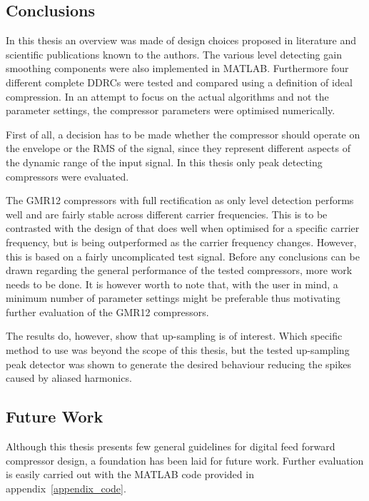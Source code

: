 \documentclass[../main2.tex]{subfiles}
\begin{document}
\subsection{Conclusions}\label{discussion_results}
In this thesis an overview was made of design choices proposed in literature and scientific publications known to the authors. The various level detecting gain smoothing components were also implemented in MATLAB\textsuperscript{\textregistered}. Furthermore four different complete DDRCs were tested and compared using a definition of ideal compression. In an attempt to focus on the actual algorithms and not the parameter settings, the compressor parameters were optimised numerically.

First of all, a decision has to be made whether the compressor should operate on the envelope or the RMS of the signal, since they represent different aspects of the dynamic range of the input signal. In this thesis only peak detecting compressors were evaluated.

The GMR12 compressors with full rectification as only level detection performs well and are fairly stable across different carrier frequencies.  This is to be contrasted with the design of \cite{mcnally1984dynamic} that does well when optimised for a specific carrier frequency, but is being outperformed as the carrier frequency changes. However, this is based on a fairly uncomplicated test signal. Before any conclusions can be drawn regarding the general performance of the tested compressors, more work needs to be done. It is however worth to note that, with the user in mind, a minimum number of parameter settings might be preferable thus motivating further evaluation of the GMR12 compressors.

The results do, however, show that up-sampling is of interest. Which specific method to use was beyond the scope of this thesis, but the tested up-sampling peak detector was shown to generate the desired behaviour reducing the spikes caused by aliased harmonics.


\subsection{Future Work}
Although this thesis presents few general guidelines for digital feed forward compressor design, a foundation has been laid for future work. Further evaluation is easily carried out with the MATLAB\textsuperscript{\textregistered} code provided in appendix~\ref{appendix_code}.
\end{document}
